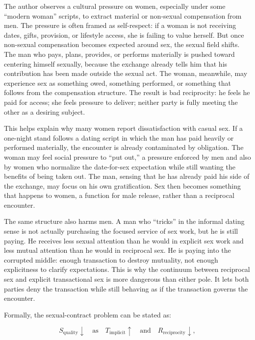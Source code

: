 \documentclass[12pt]{article}
\begin{document}
The author observes a cultural pressure on women, especially under some ``modern woman'' scripts, to extract material or non-sexual compensation from men. The pressure is often framed as self-respect: if a woman is not receiving dates, gifts, provision, or lifestyle access, she is failing to value herself. But once non-sexual compensation becomes expected around sex, the sexual field shifts. The man who pays, plans, provides, or performs materially is pushed toward centering himself sexually, because the exchange already tells him that his contribution has been made outside the sexual act. The woman, meanwhile, may experience sex as something owed, something performed, or something that follows from the compensation structure. The result is bad reciprocity: he feels he paid for access; she feels pressure to deliver; neither party is fully meeting the other as a desiring subject.

This helps explain why many women report dissatisfaction with casual sex. If a one-night stand follows a dating script in which the man has paid heavily or performed materially, the encounter is already contaminated by obligation. The woman may feel social pressure to ``put out,'' a pressure enforced by men and also by women who normalize the date-for-sex expectation while still wanting the benefits of being taken out. The man, sensing that he has already paid his side of the exchange, may focus on his own gratification. Sex then becomes something that happens to women, a function for male release, rather than a reciprocal encounter.

The same structure also harms men. A man who ``tricks'' in the informal dating sense is not actually purchasing the focused service of sex work, but he is still paying. He receives less sexual attention than he would in explicit sex work and less mutual attention than he would in reciprocal sex. He is paying into the corrupted middle: enough transaction to destroy mutuality, not enough explicitness to clarify expectations. This is why the continuum between reciprocal sex and explicit transactional sex is more dangerous than either pole. It lets both parties deny the transaction while still behaving as if the transaction governs the encounter.

Formally, the sexual-contract problem can be stated as:

\begin{equation}
  S_{\text{quality}} \downarrow
  \quad \text{as} \quad
  T_{\text{implicit}} \uparrow
  \quad \text{and} \quad
  R_{\text{reciprocity}} \downarrow,
\end{equation}
\end{document}
